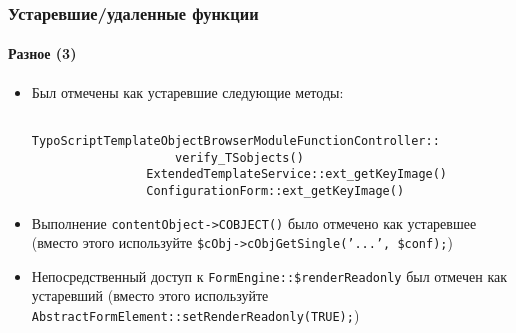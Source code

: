 \begin{frame}[fragile]
	\frametitle{Устаревшие/удаленные функции}
	\framesubtitle{Разное (3)}

	\begin{itemize}
		\item Был отмечены как устаревшие следующие методы:

			\begin{lstlisting}
				TypoScriptTemplateObjectBrowserModuleFunctionController::
				    verify_TSobjects()
				ExtendedTemplateService::ext_getKeyImage()
				ConfigurationForm::ext_getKeyImage()
			\end{lstlisting}

 		\item Выполнение \texttt{contentObject->COBJECT()} было отмечено как устаревшее\newline
 			\small(вместо этого используйте \texttt{\$cObj->cObjGetSingle('...', \$conf);})\normalsize
 
		\item Непосредственный доступ к \texttt{FormEngine::\$renderReadonly} был отмечен как устаревший\newline
			\small(вместо этого используйте \texttt{AbstractFormElement::setRenderReadonly(TRUE);})\normalsize
 
	\end{itemize}

\end{frame}


